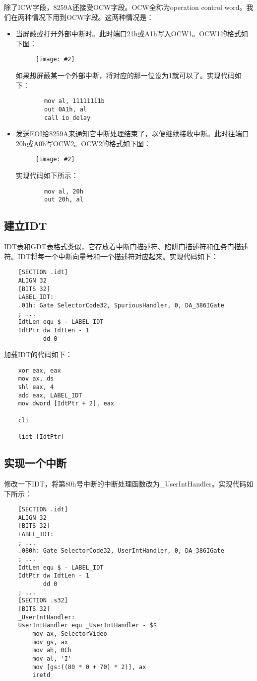\documentclass[a4paper,left=2.5cm,right=2.5cm,11pt]{article}
\newcommand{\sizedfic}[2]{\begin{figure}[H]
		\center
		\texttt{[image: \#2]}
	\end{figure}}
\begin{document}
	除了ICW字段，8259A还接受OCW字段。OCW全称为operation control word。我们在两种情况下用到OCW字段。这两种情况是：
	\begin{itemize}
		\item 当屏蔽或打开外部中断时。此时端口21h或A1h写入OCW1。OCW1的格式如下图：
		\sizedfic{0.4}{6.png}

		如果想屏蔽某一个外部中断，将对应的那一位设为1就可以了。实现代码如下：
		\begin{lstlisting}
		mov al, 11111111b
		out 0A1h, al
		call io_delay
		\end{lstlisting}

		\item 发送EOI给8259A来通知它中断处理结束了，以便继续接收中断。此时往端口20h或A0h写OCW2。OCW2的格式如下图：
		\sizedfic{0.4}{7.png}

		实现代码如下所示：
		\begin{lstlisting}
		mov al, 20h
		out 20h, al
		\end{lstlisting}
	\end{itemize}

\subsection{建立IDT}
	IDT表和GDT表格式类似，它存放着中断门描述符、陷阱门描述符和任务门描述符。IDT将每一个中断向量号和一个描述符对应起来。实现代码如下：
	\begin{lstlisting}
	[SECTION .idt]
	ALIGN 32
	[BITS 32]
	LABEL_IDT:
	.01h: Gate SelectorCode32, SpuriousHandler, 0, DA_386IGate
	; ...
	IdtLen equ $ - LABEL_IDT
	IdtPtr dw IdtLen - 1
		   dd 0
	\end{lstlisting}

	加载IDT的代码如下：
	\begin{lstlisting}
	xor eax, eax
	mov ax, ds
	shl eax, 4
	add eax, LABEL_IDT
	mov dword [IdtPtr + 2], eax

	cli

	lidt [IdtPtr]
	\end{lstlisting}

\subsection{实现一个中断}
	修改一下IDT，将第80h号中断的中断处理函数改为\_UserIntHandler。实现代码如下所示：
	\begin{lstlisting}
	[SECTION .idt]
	ALIGN 32
	[BITS 32]
	LABEL_IDT:
	; ...
	.080h: Gate SelectorCode32, UserIntHandler, 0, DA_386IGate
	; ...
	IdtLen equ $ - LABEL_IDT
	IdtPtr dw IdtLen - 1
	       dd 0
	; ...
	[SECTION .s32]
	[BITS 32]
	_UserIntHandler:
	UserIntHandler equ _UserIntHandler - $$
		mov ax, SelectorVideo
		mov gs, ax
		mov ah, 0Ch
		mov al, 'I'
		mov [gs:((80 * 0 + 70) * 2)], ax
		iretd
	\end{lstlisting}
\end{document}
